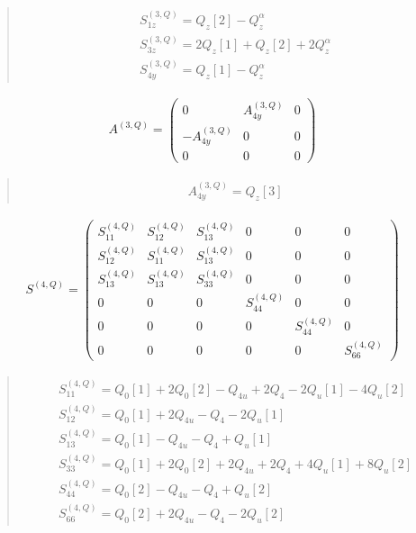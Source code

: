 \documentclass[fleqn,10pt]{jsarticle}
\begin{document}
\begin{quote}
\begin{align*}
& S^{(3,Q)}_{1z} = Q_{z}[2] - Q_{z}^{\alpha} \\
& S^{(3,Q)}_{3z} = 2 Q_{z}[1] + Q_{z}[2] + 2 Q_{z}^{\alpha} \\
& S^{(3,Q)}_{4y} = Q_{z}[1] - Q_{z}^{\alpha}
\end{align*}
\end{quote}
\begin{align*}
A^{(3,Q)} = \begin{pmatrix} 0 & A^{(3,Q)}_{4y} & 0 \\ - A^{(3,Q)}_{4y} & 0 & 0 \\ 0 & 0 & 0 \end{pmatrix}
\end{align*}
\begin{quote}
\begin{align*}
& A^{(3,Q)}_{4y} = Q_{z}[3]
\end{align*}
\end{quote}
\begin{align*}
S^{(4,Q)} = \begin{pmatrix} S^{(4,Q)}_{11} & S^{(4,Q)}_{12} & S^{(4,Q)}_{13} & 0 & 0 & 0 \\ S^{(4,Q)}_{12} & S^{(4,Q)}_{11} & S^{(4,Q)}_{13} & 0 & 0 & 0 \\ S^{(4,Q)}_{13} & S^{(4,Q)}_{13} & S^{(4,Q)}_{33} & 0 & 0 & 0 \\ 0 & 0 & 0 & S^{(4,Q)}_{44} & 0 & 0 \\ 0 & 0 & 0 & 0 & S^{(4,Q)}_{44} & 0 \\ 0 & 0 & 0 & 0 & 0 & S^{(4,Q)}_{66} \end{pmatrix}
\end{align*}
\begin{quote}
\begin{align*}
& S^{(4,Q)}_{11} = Q_{0}[1] + 2 Q_{0}[2] - Q_{4u} + 2 Q_{4} - 2 Q_{u}[1] - 4 Q_{u}[2] \\
& S^{(4,Q)}_{12} = Q_{0}[1] + 2 Q_{4u} - Q_{4} - 2 Q_{u}[1] \\
& S^{(4,Q)}_{13} = Q_{0}[1] - Q_{4u} - Q_{4} + Q_{u}[1] \\
& S^{(4,Q)}_{33} = Q_{0}[1] + 2 Q_{0}[2] + 2 Q_{4u} + 2 Q_{4} + 4 Q_{u}[1] + 8 Q_{u}[2] \\
& S^{(4,Q)}_{44} = Q_{0}[2] - Q_{4u} - Q_{4} + Q_{u}[2] \\
& S^{(4,Q)}_{66} = Q_{0}[2] + 2 Q_{4u} - Q_{4} - 2 Q_{u}[2]
\end{align*}
\end{quote}
\end{document}
